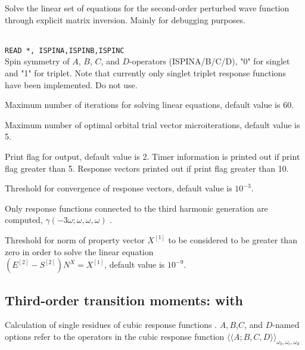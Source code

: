 \begin{description}
\item{} Solve the linear set of equations for the
  second-order perturbed wave function through explicit matrix
  inversion. Mainly for debugging purposes.

\item{}\\
\verb|READ *, ISPINA,ISPINB,ISPINC|\\
Spin symmetry of $A$, $B$, $C$, and $D$-operators (ISPINA/B/C/D),
"0" for singlet and "1" for triplet. Note that currently only singlet
triplet response functions have been implemented. Do not use.

\item{}
Maximum number of iterations for solving linear equations, default value is 60.

\item{}
Maximum number of optimal orbital trial vector microiterations,
default value is 5. 

\item{}
Print flag for output, default value is 2. Timer information is printed
out if print flag greater than 5. Response vectors printed out if
print flag greater than 10.

\item{}
Threshold for convergence of response vectors, default value is $10^{-3}$.

\item{}
Only response functions connected to the third harmonic
generation are
computed, $\gamma(-3\omega;\omega,\omega,\omega)$ \cite{djpnylhajcp105}.

\item{}
Threshold for norm of property vector $X^{[1]}$ to be considered to be
greater than zero in order to solve the linear
equation \\
$\left( E^{[2]} - S^{[2]} \right)N^{X} = X^{[1]}$, default
value is $10^{-9}$. 



\end{description}

\subsection{Third-order transition moments:  with }
Calculation of single residues of
cubic response functions
\cite{pndjovhacpl242,djpnhajcp105,pndjhapdkrthhkcpl253}.
$A,B$,$C$, and $D$-named options refer to the operators in the cubic
response function 
$\langle\!\langle A;B,C,D \rangle\!\rangle_{\omega_b,\omega_c,\omega_d}$

